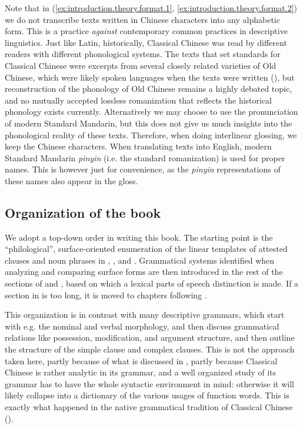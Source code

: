 \documentclass[UTF8, a4paper, oneside, scheme=plain, 12pt]{ctexrep}
\newcommand{\form}[1]{\emph{#1}}
\begin{document}
Note that in (\ref{ex:introduction.theory.format.1}, \ref{ex:introduction.theory.format.2}) we do not transcribe texts written in Chinese characters into any alphabetic form.
This is a practice \emph{against} contemporary common practices in descriptive linguistics.
Just like Latin, historically, Classical Chinese was read by different readers with different phonological systems.
The texts that set standards for Classical Chinese were excerpts from several closely related varieties of Old Chinese, which were likely spoken languages when the texts were written
(),
but reconstruction of the phonology of Old Chinese remains a highly debated topic,
and no mutually accepted lossless romanization that reflects the historical phonology exists currently.
Alternatively we may choose to use the pronunciation of modern Standard Mandarin,
but this does not give us much insights into the phonological reality of these texts.
Therefore, when doing interlinear glossing, we keep the Chinese characters.
When translating texts into English, modern Standard Mandarin \form{pinyin} (i.e. the standard romanization) is used for proper names.
This is however just for convenience, as the \form{pinyin} representations of these names also appear in the gloss.

\subsection{Organization of the book}

We adopt a top-down order in writing this book.
The starting point is the ``philological'', surface-oriented enumeration of the linear templates of attested clauses and noun phrases in , , and .
Grammatical systems identified when analyzing and comparing surface forms
are then introduced in the rest of the sections of  and ,
based on which a lexical parts of speech distinction is made.
If a section in  is too long,
it is moved to chapters following .

This organization is in contrast with many descriptive grammars,
which start with e.g. the nominal and verbal morphology,
and then discuss grammatical relations like possession, modification, and argument structure,
and then outline the structure of the simple clause and complex clauses.
This is not the approach taken here,
partly because of what is discussed in ,
partly because Classical Chinese is rather analytic in its grammar,
and a well organized study of its grammar has to have the whole syntactic environment in mind:
otherwise it will likely collapse into a dictionary of the various usages of function words.
This is exactly what happened in the native grammatical tradition of Classical Chinese
().
\end{document}
